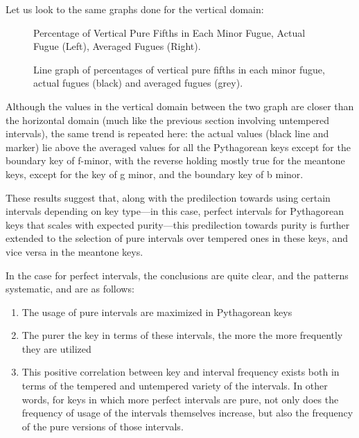 Let us look to the same graphs done for the vertical domain:



\begin{figure}[H]
\vspace{1.5em}
    \centering
    \caption[Percentage of Vertical Pure Fifths in Each Minor Fugue. ]{Percentage of Vertical Pure Fifths in Each Minor Fugue, Actual Fugue (Left), Averaged Fugues (Right).}
\end{figure}


\begin{figure}[H]
\vspace{1.5em}
    \centering
    \caption[Line graph of percentages of vertical pure fifths in each minor fugue, actual fugues vs. averaged fugues. ]{Line graph of percentages of vertical pure fifths in each minor fugue, actual fugues (black) and averaged fugues (grey).}
\end{figure}    Although the values in the vertical domain between the two graph are
closer than the horizontal domain (much like the previous section
involving untempered intervals), the same trend is repeated here: the
actual values (black line and marker) lie above the averaged values for
all the Pythagorean keys except for the boundary key of f-minor, with
the reverse holding mostly true for the meantone keys, except for the
key of g minor, and the boundary key of b minor.

These results suggest that, along with the predilection towards using
certain intervals depending on key type---in this case, perfect
intervals for Pythagorean keys that scales with expected
purity---this predilection towards purity is further extended to the
selection of pure intervals over tempered ones in these keys, and vice
versa in the meantone keys.

In the case for perfect intervals, the conclusions are quite clear, and
the patterns systematic, and are as follows:

\begin{enumerate}
\def\labelenumi{\arabic{enumi}.}
\tightlist
\item
  The usage of pure intervals are maximized in Pythagorean keys
\item
  The purer the key in terms of these intervals, the more the more
  frequently they are utilized
\item
  This positive correlation between key and interval frequency exists
  both in terms of the tempered and untempered variety of the intervals.
  In other words, for keys in which more perfect intervals are pure, not
  only does the frequency of usage of the intervals themselves increase,
  but also the frequency of the pure versions of those intervals.
\end{enumerate}

